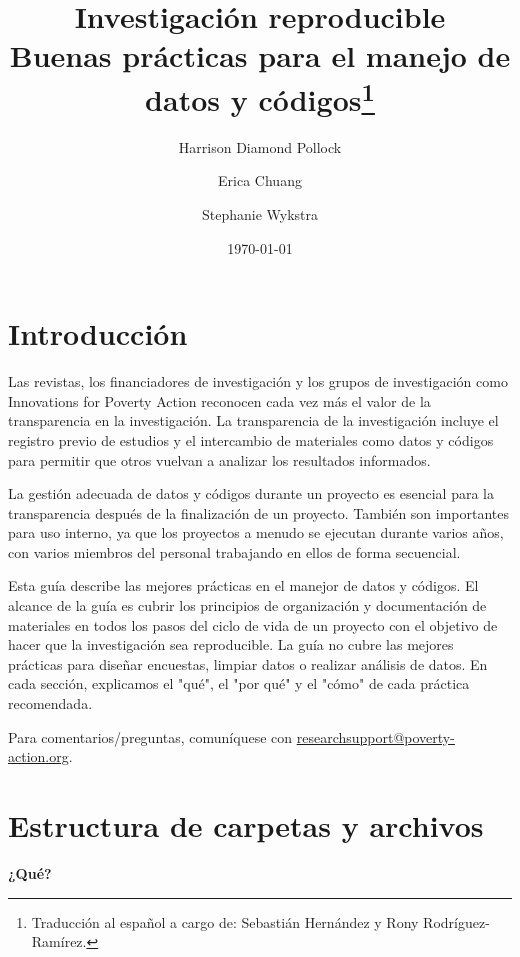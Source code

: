 \documentclass[11pt,en]{elegantpaper}
\title{Investigación reproducible \\ Buenas prácticas para el manejo de datos y códigos\footnote{Traducción al español a cargo de: Sebastián Hernández y Rony Rodríguez-Ramírez.}}
\author{Harrison Diamond Pollock \and Erica Chuang \and Stephanie Wykstra}
\date{\today}
\begin{document}
\maketitle
\tableofcontents
\newpage 
\section{Introducción}
\label{sec:intro}

Las revistas, los financiadores de investigación y los grupos de investigación como Innovations for Poverty Action reconocen cada vez más el valor de la transparencia en la investigación. La transparencia de la investigación incluye el registro previo de estudios y el intercambio de materiales como datos y códigos para permitir que otros vuelvan a analizar los resultados informados.

La gestión adecuada de datos y códigos durante un proyecto es esencial para la transparencia después de la finalización de un proyecto. También son importantes para uso interno, ya que los proyectos a menudo se ejecutan durante varios años, con varios miembros del personal trabajando en ellos de forma secuencial.

Esta guía describe las mejores prácticas en el manejor de datos y códigos. El alcance de la guía es cubrir los principios de organización y documentación de materiales en todos los pasos del ciclo de vida de un proyecto con el objetivo de hacer que la investigación sea reproducible. La guía no cubre las mejores prácticas para diseñar encuestas, limpiar datos o realizar análisis de datos. En cada sección, explicamos el "qué", el "por qué" y el "cómo" de cada práctica recomendada.

Para comentarios/preguntas, comuníquese con \href{mailto:researchsupport@poverty-action.org}{researchsupport@poverty-action.org}.
\newpage 
\section{Estructura de carpetas y archivos}
\label{sec:estructura}
\textbf{¿Qué?}
\end{document}
